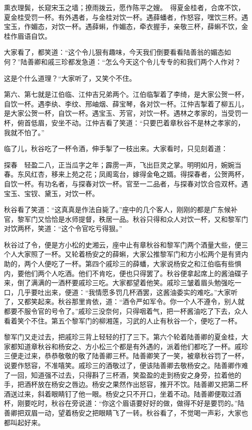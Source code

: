 \documentclass[12pt,UTF8]{ctexbook}
\begin{document}
{{{熏衣理鬓，长窥宋玉之墙；撩雨拨云，愿作陈平之嫂。　得夏金桂者，合席不饮，夏金桂受罚一杯。有外遇者，与金桂对饮一杯。遇薛蟠者，作怒容，嘿饮三杯。遇宝玉，作媚态，对饮一杯。遇薛蝌，作媚态，牵衣握手，亲敬三杯，薛蝌不饮，金桂作眉语自饮。

大家看了，都笑道：“这个令儿狠有趣味，今天我们倒要看看陆善翁的媚态如何？”陆善卿和戚三珍都发急道：“怎么今天这个令儿专专的和我们两个人作对？

这是个什么道理？“大家听了，又笑个不住。

第六、第七就是江伯临、江仲吉兄弟两个。江伯临掣着了李绮，是大家公贺一杯，自饮一杯。遇李纨、李纹、邢岫烟、薛宝琴，各对饮一杯。江仲吉掣着了柳五儿，是大家公贺一杯，自饮一杯。遇宝玉、芳官，对饮一杯。遇林之孝家的，当受罚一杯，俯首低眉，安坐不动。江仲吉看了笑道：“只要巴着章秋谷不是林之孝家的，我就不怕了。”

临了儿，秋谷吃了一杯令酒，伸手掣了一枝出来。大家看时，只见刻着道：

探春　轻盈二八，正当瓜字之年；霹雳一声，飞出巨灵之掌。明明如月，婉婉当春。东风红杏，移来上苑之花；凤阁鸾台，嫁得金龟之婿。得探春者，公贺两杯，自饮一杯。有功名者，与探春对饮一杯。官至一二品者，与探春对饮合卺双杯。遇宝玉、宝钗、黛玉，对饮一杯。

秋谷看了笑道：“这真真是作法自毙了。”座中的几个客人，刚刚的都是广东候补官，黎军门又恰恰是水师提督，秩居一品。秋谷只得和众人对饮一杯，又和黎军门对饮两杯，笑道：“这个令官吃亏得狠。”

秋谷过了令，便是方小松的史湘云，座中止有章秋谷和黎军门两个酒量大些，便三个人大家照了一杯。又轮着杨安之的薛蝌，大家公推黎军门和方小松两个是有贤内助的，两个人便吃了一杯。第四个戚珍三的薛蟠，大家说杨安之和江伯临有些惧内，要他们两个人吃酒。他们不肯吃，便也只得罢了。秋谷便拿起席上的酱油碟子来，倒了满满的一酒杯要戚珍三吃。大家都望着他笑。戚珍三皱着眉头勉强吃一口，几乎要吐出来，便道：“我情愿多罚几杯酒罢，这酱油委实的难吃。”大家听了，又都笑起来。秋谷那里肯依，道：“酒令严如军令。你一个人不遵令，别人就都要不服令官的号令了。”戚珍三没奈何，只得咽着气，把一杯酱油吃了下去，众人看着笑个不住。第五个黎军门的柳湘莲，习武的人止有秋谷一个，便吃了一杯。

黎军门又走过去，把戚珍三背上轻轻的打了三下。第六个轮着陆善卿的夏金桂，大家都知道章秋谷和杨安之、方小松三个都是有外遇的，派着他们都吃了一杯。戚珍三便走过来，恭恭敬敬的敬了陆善卿三杯。陆善卿笑了一笑，被章秋谷罚了一杯，说要作怒容，不准嘻笑。戚珍三的酒敬过了，便该陆善卿去敬杨安之。陆善卿作难了一回，知道强不过去，只得斟了三杯酒，笑盈盈的走到杨安之身旁，拉着他的手，把酒杯放在杨安之唇边。杨安之果然作出怒容，推开不饮。陆善卿又把第二杯酒送过来，斜着眼睛钉了他一眼。杨安之只不开口，坐着不动。陆善卿便取过酒杯，刚要吃时，秋谷在旁说道：“你这个眉语要好好的做，做得不好是要罚的。”陆善卿把双眉一动，望着杨安之把眼睛飞了一转。秋谷看了，不觉喝一声彩，大家也都叫起好来。

}}}
\end{document}
